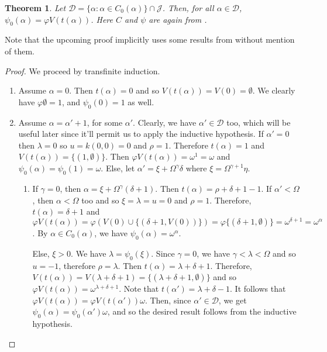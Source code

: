\documentclass{article}
\theoremstyle{definition}
\theoremstyle{plain}
\newtheorem{theorem}[definition]{Theorem}
\theoremstyle{plain}
\theoremstyle{plain}
\theoremstyle{plain}
\theoremstyle{remark}
\theoremstyle{remark}
\theoremstyle{remark}
\theoremstyle{plain}
\theoremstyle{plain}
\begin{document}
\begin{theorem}
Let $\mathcal{D} = \{\alpha: \alpha \in C_0(\alpha)\} \cap \mathcal{J}$. Then, for all $\alpha \in \mathcal{D}$, $\psi_0(\alpha) = \varphi V(t(\alpha))$. Here $C$ and $\psi$ are again from \cite{buchholz}.
\end{theorem}

Note that the upcoming proof implicitly uses some results from \cite{buchholz} without mention of them.

\begin{proof}
We proceed by transfinite induction.

\begin{enumerate}
    \item Assume $\alpha = 0$. Then $t(\alpha) = 0$ and so $V(t(\alpha)) = V(0) = \emptyset$. We clearly have $\varphi \emptyset = 1$, and $\psi_0(0) = 1$ as well.
    \item Assume $\alpha = \alpha'+1$, for some $\alpha'$. Clearly, we have $\alpha' \in \mathcal{D}$ too, which will be useful later since it'll permit us to apply the inductive hypothesis. If $\alpha' = 0$ then $\lambda = 0$ so $u = k(0, 0) = 0$ and $\rho = 1$. Therefore $t(\alpha) = 1$ and $V(t(\alpha)) = \{(1,\emptyset)\}$. Then $\varphi V(t(\alpha)) = \omega^1 = \omega$ and $\psi_0(\alpha) = \psi_0(1) = \omega$. Else, let $\alpha' = \xi+\Omega^\gamma \delta$ where $\xi = \Omega^{\gamma+1} \eta$. 
    \begin{enumerate}
        \item If $\gamma = 0$, then $\alpha = \xi + \Omega^\gamma (\delta+1)$. Then $t(\alpha) = \rho+\delta+1-1$. If $\alpha' < \Omega$, then $\alpha < \Omega$ too and so $\xi = \lambda = u = 0$ and $\rho = 1$. Therefore, $t(\alpha) = \delta+1$ and $\varphi V(t(\alpha)) = \varphi (V(0) \cup \{(\delta+1,V(0))\}) = \varphi \{(\delta+1,\emptyset)\} = \omega^{\delta+1} = \omega^\alpha$. By $\alpha \in C_0(\alpha)$, we have $\psi_0(\alpha) = \omega^\alpha$.
        
        Else, $\xi > 0$. We have $\lambda = \psi_0(\xi)$. Since $\gamma = 0$, we have $\gamma < \lambda < \Omega$ and so $u = -1$, therefore $\rho = \lambda$. Then $t(\alpha)  = \lambda+\delta+1$. Therefore, $V(t(\alpha)) = V(\lambda+\delta+1) = \{(\lambda+\delta+1, \emptyset)\}$ and so $\varphi V(t(\alpha)) = \omega^{\lambda+\delta+1}$. Note that $t(\alpha') = \lambda + \delta - 1$. It follows that $\varphi V(t(\alpha)) = \varphi V(t(\alpha')) \omega$. Then, since $\alpha' \in \mathcal{D}$, we get $\psi_0(\alpha) = \psi_0(\alpha') \omega$, and so the desired result follows from the inductive hypothesis.
        

\end{enumerate}
\end{enumerate}
\end{proof}
\end{document}
